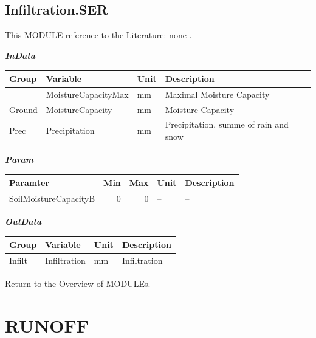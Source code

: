 \documentclass[
]{book}
\begin{document}
\hypertarget{Infiltration.SER}{%
\subsection{Infiltration.SER}\label{Infiltration.SER}}

This MODULE reference to the Literature: none \citep{none}.

\textbf{\emph{InData}}

\begin{table}[!h]
\centering
\begin{tabular}{l|l|l|l}
\hline
Group & Variable & Unit & Description\\
\hline
 & MoistureCapacityMax & mm & Maximal Moisture Capacity\\
\cline{2-4}
\multirow{-2}{*}{\raggedright\arraybackslash Ground} & MoistureCapacity & mm & Moisture Capacity\\
\cline{1-4}
Prec & Precipitation & mm & Precipitation, summe of rain and snow\\
\hline
\end{tabular}
\end{table}

\textbf{\emph{Param}}

\begin{table}[!h]
\centering
\begin{tabular}{l|r|r|l|l}
\hline
Paramter & Min & Max & Unit & Description\\
\hline
SoilMoistureCapacityB & 0 & 0 & -- & --\\
\hline
\end{tabular}
\end{table}

\textbf{\emph{OutData}}

\begin{table}[!h]
\centering
\begin{tabular}{l|l|l|l}
\hline
Group & Variable & Unit & Description\\
\hline
Infilt & Infiltration & mm & Infiltration\\
\hline
\end{tabular}
\end{table}

Return to the \protect\hyperlink{module}{Overview} of MODULEs.

\hypertarget{RUNOFF}{%
\section{RUNOFF}\label{RUNOFF}}
\end{document}

